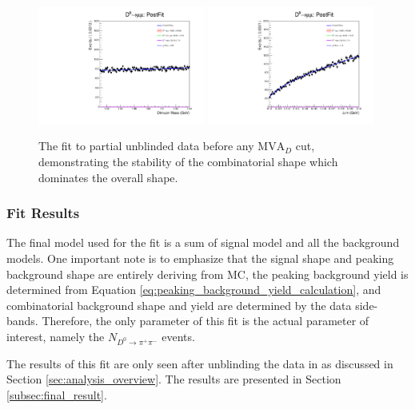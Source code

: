 \begin{figure}[htp]
    \begin{center}
      \includegraphics[width=0.49\textwidth]{figures/chapter4/signal_fit/partial_fit_m.pdf}
      \includegraphics[width=0.49\textwidth]{figures/chapter4/signal_fit/partial_fit_dm.pdf}\\
    \end{center}
    \caption{
      The fit to partial unblinded data before any $\text{MVA}_D$ cut, demonstrating the stability of the combinatorial shape which dominates the overall shape.
    }
    \label{fig:signal_comb_uml_fit}
\end{figure}

\subsubsection{Fit Results}

The final model used for the fit is a sum of signal model and all the background models. One important note is to emphasize that the signal shape and peaking background shape are entirely deriving from MC, the peaking background yield is determined from Equation \ref{eq:peaking_background_yield_calculation}, and combinatorial background shape and yield are determined by the data side-bands. Therefore, the only parameter of this fit is the actual parameter of interest, namely the $N_{D^0 \to \pi^+ \pi^-}$ events. 

The results of this fit are only seen after unblinding the data in as discussed in Section \ref{sec:analysis_overview}. The results are presented in Section \ref{subsec:final_result}.

